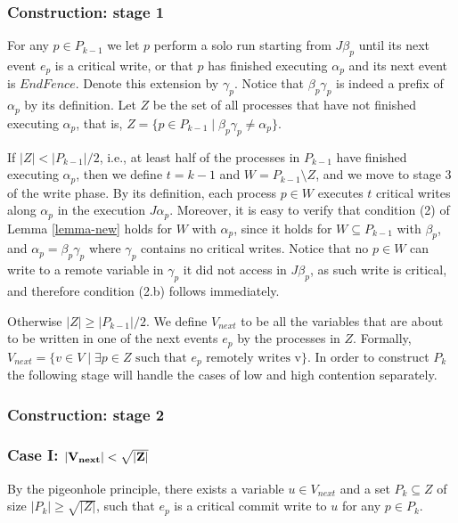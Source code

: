 \subsubsection{Construction: stage 1}
For any $p \in P_{k-1}$ we let $p$ perform a solo run starting from $J \beta_p$ until its next event $e_p$ is a critical write, or that $p$ has finished executing $\alpha_p$ and its next event is $EndFence$. Denote this extension by $\gamma_p$. Notice that $\beta_p \gamma_p$ is indeed a prefix of $\alpha_p$ by its definition.
Let $Z$ be the set of all processes that have not finished executing $\alpha_p$, that is, $Z = \{p \in P_{k-1} \mid \beta_p \gamma_p \neq \alpha_p\}$.

If $|Z|<|P_{k-1}|/2$, i.e., at least half of the processes in $P_{k-1}$ have finished executing $\alpha_p$, then we define $t=k-1$ and $W = P_{k-1} \setminus Z$, and we move to stage 3 of the write phase.
By its definition, each process $p \in W$ executes $t$ critical writes along $\alpha_p$ in the execution $J \alpha_p$. Moreover, it is easy to verify that condition (2) of Lemma \ref{lemma-new} holds for $W$ with $\alpha_p$, since it holds for $W \subseteq P_{k-1}$ with $\beta_p$, and $\alpha_p = \beta_p \gamma_p$ where $\gamma_p$ contains no critical writes. Notice that no $p \in W$ can write to a remote variable in $\gamma_p$ it did not access in $J \beta_p$, as such write is critical, and therefore condition (2.b) follows immediately.

Otherwise $|Z| \geq |P_{k-1}|/2$. We define $V_{next}$ to be all the variables that are about to be written in one of the next events $e_p$ by the processes in $Z$. Formally, $V_{next} = \{v \in V \mid \exists p \in Z \text{ such that } e_p \text{ remotely writes v}\}$. In order to construct $P_k$ the following stage will handle the cases of low and high contention separately.


\subsubsection{Construction: stage 2}


\subsubsection*{\hspace{5mm} Case I: $\bf |V_{next}| < \sqrt{|Z|}$}

By the pigeonhole principle, there exists a variable $u \in V_{next}$ and a set $P_k \subseteq Z$ of size $|P_k| \geq \sqrt{|Z|}$, such that $e_p$ is a critical commit write to $u$ for any $p \in P_k$.


